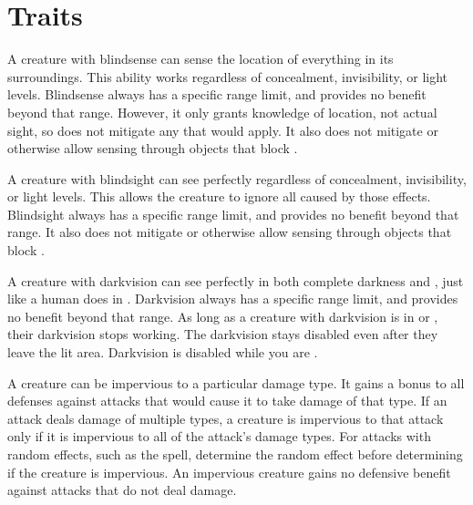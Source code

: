 \newpage
\section{Traits}\label{Traits}

        A creature with blindsense can sense the location of everything in its surroundings.
        This ability works regardless of concealment, invisibility, or light levels.
        Blindsense always has a specific range limit, and provides no benefit beyond that range.
        However, it only grants knowledge of location, not actual sight, so does not mitigate any  that would apply.
        It also does not mitigate  or otherwise allow sensing through objects that block .

        A creature with blindsight can see perfectly regardless of concealment, invisibility, or light levels.
        This allows the creature to ignore all  caused by those effects.
        Blindsight always has a specific range limit, and provides no benefit beyond that range.
        It also does not mitigate  or otherwise allow sensing through objects that block .

        A creature with darkvision can see perfectly in both complete darkness and , just like a human does in .
        Darkvision always has a specific range limit, and provides no benefit beyond that range.
        As long as a creature with darkvision is in  or , their darkvision stops working.
        The darkvision  stays disabled even after they leave the lit area.
        Darkvision is disabled while you are \dazzled.

        A creature can be impervious to a particular damage type.
        It gains a  bonus to all defenses against attacks that would cause it to take damage of that type.
        If an attack deals damage of multiple types, a creature is impervious to that attack only if it is impervious to all of the attack's damage types.
        For attacks with random effects, such as the  spell, determine the random effect before determining if the creature is impervious.
        An impervious creature gains no defensive benefit against attacks that do not deal damage.

